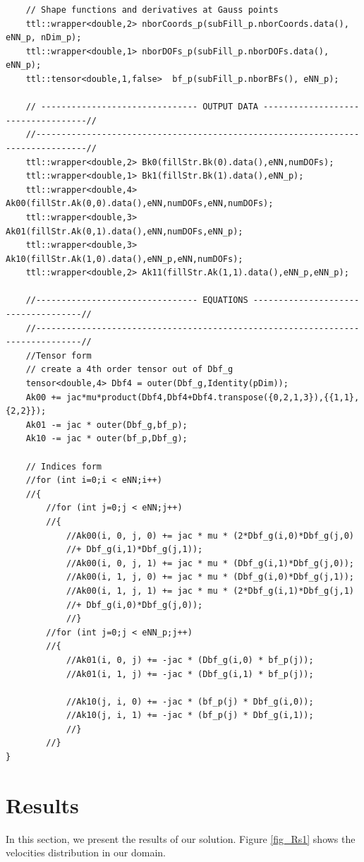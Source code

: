 \documentclass[]{article}
\begin{document}
\begin{lstlisting}
	// Shape functions and derivatives at Gauss points
	ttl::wrapper<double,2> nborCoords_p(subFill_p.nborCoords.data(), eNN_p, nDim_p);
	ttl::wrapper<double,1> nborDOFs_p(subFill_p.nborDOFs.data(), eNN_p);
	ttl::tensor<double,1,false>  bf_p(subFill_p.nborBFs(), eNN_p);
	
	// ------------------------------- OUTPUT DATA -----------------------------------//
	//--------------------------------------------------------------------------------//
	ttl::wrapper<double,2> Bk0(fillStr.Bk(0).data(),eNN,numDOFs);
	ttl::wrapper<double,1> Bk1(fillStr.Bk(1).data(),eNN_p);
	ttl::wrapper<double,4> Ak00(fillStr.Ak(0,0).data(),eNN,numDOFs,eNN,numDOFs);
	ttl::wrapper<double,3> Ak01(fillStr.Ak(0,1).data(),eNN,numDOFs,eNN_p);
	ttl::wrapper<double,3> Ak10(fillStr.Ak(1,0).data(),eNN_p,eNN,numDOFs);
	ttl::wrapper<double,2> Ak11(fillStr.Ak(1,1).data(),eNN_p,eNN_p);
	
	//-------------------------------- EQUATIONS ------------------------------------//
	//-------------------------------------------------------------------------------//
	//Tensor form
	// create a 4th order tensor out of Dbf_g
	tensor<double,4> Dbf4 = outer(Dbf_g,Identity(pDim));
	Ak00 += jac*mu*product(Dbf4,Dbf4+Dbf4.transpose({0,2,1,3}),{{1,1},{2,2}});
	Ak01 -= jac * outer(Dbf_g,bf_p);
	Ak10 -= jac * outer(bf_p,Dbf_g);
	
	// Indices form
	//for (int i=0;i < eNN;i++)
	//{
		//for (int j=0;j < eNN;j++)
		//{
			//Ak00(i, 0, j, 0) += jac * mu * (2*Dbf_g(i,0)*Dbf_g(j,0) 
			//+ Dbf_g(i,1)*Dbf_g(j,1));
			//Ak00(i, 0, j, 1) += jac * mu * (Dbf_g(i,1)*Dbf_g(j,0));
			//Ak00(i, 1, j, 0) += jac * mu * (Dbf_g(i,0)*Dbf_g(j,1));
			//Ak00(i, 1, j, 1) += jac * mu * (2*Dbf_g(i,1)*Dbf_g(j,1) 
			//+ Dbf_g(i,0)*Dbf_g(j,0));
			//}
		//for (int j=0;j < eNN_p;j++)
		//{
			//Ak01(i, 0, j) += -jac * (Dbf_g(i,0) * bf_p(j));
			//Ak01(i, 1, j) += -jac * (Dbf_g(i,1) * bf_p(j));
			
			//Ak10(j, i, 0) += -jac * (bf_p(j) * Dbf_g(i,0));
			//Ak10(j, i, 1) += -jac * (bf_p(j) * Dbf_g(i,1));
			//} 
		//}	
}

\end{lstlisting}
\section{Results} \label{sec: rst}
In this section, we present the results of our solution. Figure \ref{fig_Rs1} shows the velocities distribution in our domain.
\end{document}

